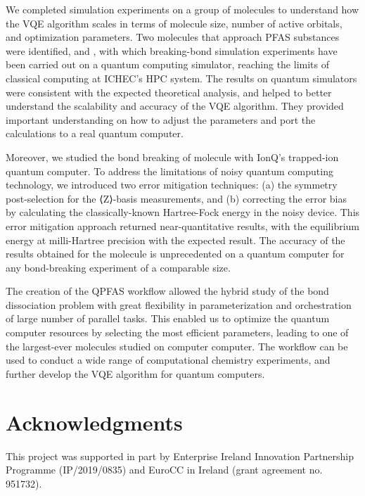 \documentclass[journal,onecolumn]{IEEEtran}
\begin{document}
We completed simulation experiments on a group of molecules to understand how the VQE algorithm scales in terms of molecule size, number of active orbitals, and optimization parameters. 
Two molecules that approach PFAS substances were identified,  and  , with which breaking-bond simulation experiments have been carried out on a quantum computing simulator, reaching the limits of classical computing at ICHEC's HPC system.
%
The results on quantum simulators were consistent with the expected theoretical analysis, and helped to better understand the scalability and accuracy of the VQE algorithm. 
They provided important understanding on how to adjust the parameters and port the calculations to a real quantum computer.

Moreover, we studied the bond breaking of  molecule with IonQ's trapped-ion quantum computer.
To address the limitations of noisy quantum computing technology, we introduced two error mitigation techniques: (a) the symmetry post-selection for the ⟨Z⟩-basis measurements, and (b) correcting the error bias by calculating the classically-known Hartree-Fock energy in the noisy device.
%
This error mitigation approach returned near-quantitative results, with the  equilibrium energy at milli-Hartree precision with the expected result. The accuracy of the results obtained for the  molecule is unprecedented on a quantum computer for any bond-breaking experiment of a comparable size. 

The creation of the QPFAS workflow allowed the hybrid study of the bond dissociation problem with great flexibility in parameterization and orchestration of large number of parallel tasks. 
This enabled us to optimize the quantum computer resources by selecting the most efficient parameters, leading to one of the largest-ever molecules studied on computer computer.
%
The workflow can be used to conduct a wide range of computational chemistry experiments, and further develop the VQE algorithm for quantum computers. 


\section*{Acknowledgments}
This project was supported in part by Enterprise Ireland Innovation Partnership Programme (IP/2019/0835) and EuroCC in Ireland (grant agreement no. 951732).
\end{document}
